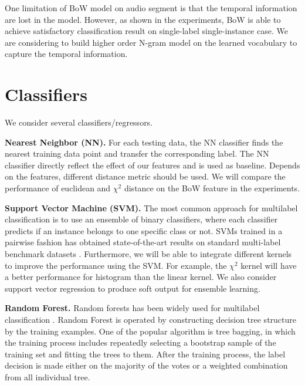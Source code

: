 \documentclass{article} %
\begin{document}
One limitation of BoW model on audio segment is that the temporal information are lost in the model. However, as shown in the experiments, BoW is able to achieve satisfactory classification result on single-label single-instance case. We are considering to build higher order N-gram model on the learned vocabulary to capture the temporal information.



\section{Classifiers}
We consider several classifiers/regressors.

\textbf{Nearest Neighbor (NN).} For each testing data, the NN classifier finds the nearest training data point and transfer the corresponding label. The NN classifier directly reflect the effect of our features and is used as baseline. Depends on the features, different distance metric should be used. We will compare the performance of euclidean and $\chi^2$ distance on the BoW feature in the experiments.

\textbf{Support Vector Machine (SVM).} The most common approach for multilabel classification is to use an ensemble of binary classifiers, where each classifier predicts if an instance belongs to
one specific class or not. SVMs trained in a pairwise fashion has obtained state-of-the-art results on standard multi-label benchmark datasets \cite{Mencia_NIPSW13}. Furthermore, we will be able to integrate different kernels to improve the performance using the SVM. For example, the $\chi^2$ kernel will have a better performance for histogram than the linear kernel. We also consider support vector regression to produce soft output for ensemble learning.


\textbf{Random Forest.} Random forests has been widely used for multilabel classification \cite{Lasseck13, chennovel13, Stowell_NIPSW13, Zhang_SDM2010}.
Random Forest is operated by constructing decision tree structure by the training examples. One of the popular algorithm is tree bagging, in which the training process includes repeatedly selecting a bootstrap sample of the training set and  fitting the trees to them. After the training process, the label decision is made either on the majority of the votes or a weighted combination from all individual tree.

\end{document}
